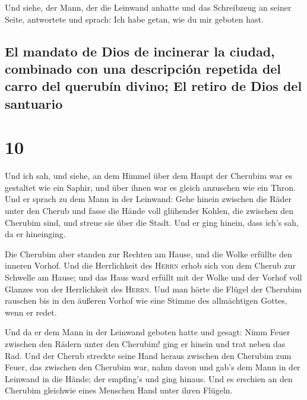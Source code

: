  Und siehe, der Mann, der die Leinwand anhatte und das
Schreibzeug an seiner Seite, antwortete und sprach: Ich habe getan, wie
du mir geboten hast.

\hypertarget{el-mandato-de-dios-de-incinerar-la-ciudad-combinado-con-una-descripciuxf3n-repetida-del-carro-del-querubuxedn-divino-el-retiro-de-dios-del-santuario}{%
\subsection{El mandato de Dios de incinerar la ciudad, combinado con una
descripción repetida del carro del querubín divino; El retiro de Dios
del
santuario}\label{el-mandato-de-dios-de-incinerar-la-ciudad-combinado-con-una-descripciuxf3n-repetida-del-carro-del-querubuxedn-divino-el-retiro-de-dios-del-santuario}}

\hypertarget{section-9}{%
\section{10}\label{section-9}}

 Und ich sah, und siehe, an dem Himmel über dem Haupt der
Cherubim war es gestaltet wie ein Saphir, und über ihnen war es gleich
anzusehen wie ein Thron.  Und er sprach zu dem Mann in der
Leinwand: Gehe hinein zwischen die Räder unter den Cherub und fasse die
Hände voll glühender Kohlen, die zwischen den Cherubim sind, und streue
sie über die Stadt. Und er ging hinein, dass ich's sah, da er
hineinging.

 Die Cherubim aber standen zur Rechten am Hause, und die
Wolke erfüllte den inneren Vorhof.  Und die Herrlichkeit
des \textsc{Herrn} erhob sich von dem Cherub zur Schwelle am Hause; und
das Haus ward erfüllt mit der Wolke und der Vorhof voll Glanzes von der
Herrlichkeit des \textsc{Herrn}.  Und man hörte die Flügel
der Cherubim rauschen bis in den äußeren Vorhof wie eine Stimme des
allmächtigen Gottes, wenn er redet.

 Und da er dem Mann in der Leinwand geboten hatte und
gesagt: Nimm Feuer zwischen den Rädern unter den Cherubim! ging er
hinein und trat neben das Rad.  Und der Cherub streckte
seine Hand heraus zwischen den Cherubim zum Feuer, das zwischen den
Cherubim war, nahm davon und gab's dem Mann in der Leinwand in die
Hände; der empfing's und ging hinaus.  Und es erschien an
den Cherubim gleichwie eines Menschen Hand unter ihren Flügeln.

